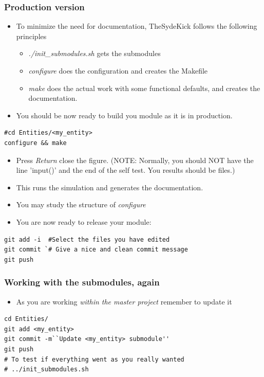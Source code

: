 \documentclass[logo=bluequo,normaltitle]{aaltoslides}
\begin{document}
\begin{frame}[t,fragile]
    \frametitle{Production version } 
    \begin{itemize}
        \item To minimize the need for documentation, TheSydeKick follows the
            following principles
            \begin{itemize}
                \item \emph{./init\_submodules.sh} gets the submodules
                \item \emph{configure} does the configuration and creates the
                    Makefile
                \item \emph{make} does the actual work with some functional
                    defaults, and creates the documentation.
            \end{itemize}
        \item You should be now ready to build you module as it is in
            production.
    \end{itemize}
\begin{lstlisting}
#cd Entities/<my_entity>
configure && make
\end{lstlisting}
    \begin{itemize}
        \item Press \emph{Return} close the figure. (NOTE: Normally, you
                should
                NOT have the line 'input()' and the end of the self test. You
            results should be files.)
        \item This runs the simulation and generates the documentation. 
        \item You may study the structure of \emph{configure}
        \item You are now ready to release your module:
    \end{itemize}
\begin{lstlisting}
git add -i  #Select the files you have edited
git commit `# Give a nice and clean commit message
git push    
\end{lstlisting}
\end{frame}

\begin{frame}[t,fragile]
    \frametitle{Working with the submodules, again} 
    \begin{itemize}
        \item As you are working \emph{within the master project}
                remember to update it
    \end{itemize}
\begin{lstlisting}
cd Entities/
git add <my_entity>
git commit -m``Update <my_entity> submodule''
git push
# To test if everything went as you really wanted
# ../init_submodules.sh
\end{lstlisting}
\end{frame}

\end{document}
